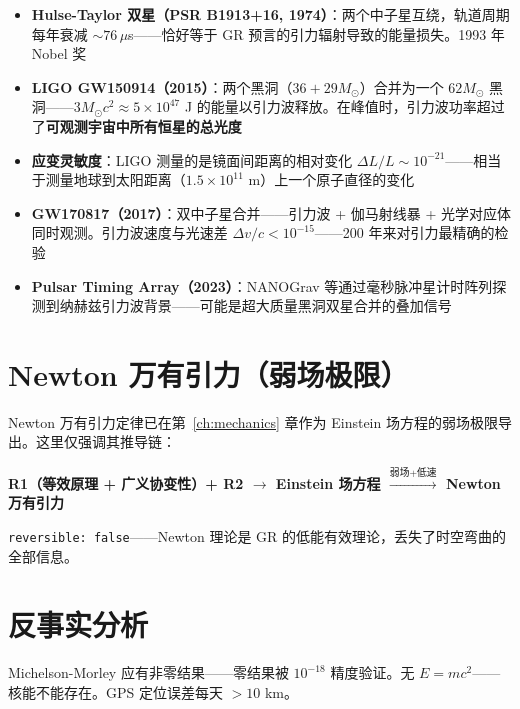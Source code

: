\begin{oombox}
  \begin{itemize}
    \item \textbf{Hulse-Taylor 双星（PSR B1913+16, 1974）}：两个中子星互绕，轨道周期每年衰减 $\sim 76\,\mu$s——恰好等于 GR 预言的引力辐射导致的能量损失。1993 年 Nobel 奖
    \item \textbf{LIGO GW150914（2015）}：两个黑洞（$36+29 M_\odot$）合并为一个 $62 M_\odot$ 黑洞——$3 M_\odot c^2 \approx 5\times 10^{47}$ J 的能量以引力波释放。在峰值时，引力波功率超过了\textbf{可观测宇宙中所有恒星的总光度}
    \item \textbf{应变灵敏度}：LIGO 测量的是镜面间距离的相对变化 $\Delta L/L \sim 10^{-21}$——相当于测量地球到太阳距离（$1.5\times10^{11}$ m）上一个原子直径的变化
    \item \textbf{GW170817（2017）}：双中子星合并——引力波 + 伽马射线暴 + 光学对应体同时观测。引力波速度与光速差 $\Delta v/c < 10^{-15}$——200 年来对引力最精确的检验
    \item \textbf{Pulsar Timing Array（2023）}：NANOGrav 等通过毫秒脉冲星计时阵列探测到纳赫兹引力波背景——可能是超大质量黑洞双星合并的叠加信号
  \end{itemize}
\end{oombox}

\section{Newton 万有引力（弱场极限）}

Newton 万有引力定律已在第~\ref{ch:mechanics} 章作为 Einstein 场方程的弱场极限导出。这里仅强调其推导链：

\begin{center}
  \textbf{R1（等效原理 + 广义协变性）+ R2 $\to$ Einstein 场方程 $\xrightarrow{\text{弱场} + \text{低速}}$ Newton 万有引力}
\end{center}

\texttt{reversible: false}——Newton 理论是 GR 的低能有效理论，丢失了时空弯曲的全部信息。
\section*{反事实分析}

\begin{limitbox}[若光速随参考系变化]
  Michelson-Morley 应有非零结果——零结果被 $10^{-18}$ 精度验证。无 $E=mc^2$——核能不能存在。GPS 定位误差每天 $>10$ km。
\end{limitbox}

